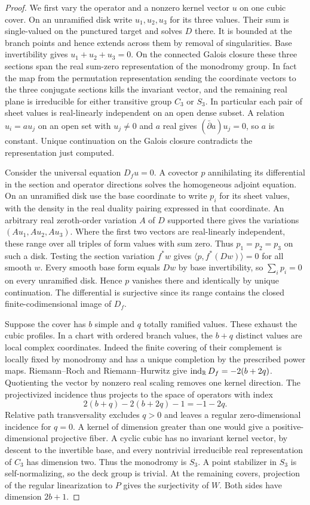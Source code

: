 \begin{proof}
We first vary the operator and a nonzero kernel vector $u$ on one
cubic cover. On an unramified disk write $u_1,u_2,u_3$ for its three
values. Their sum is single-valued on the punctured target and
solves $D$ there. It is bounded at the branch points and hence
extends across them by removal of singularities. Base invertibility
gives $u_1+u_2+u_3=0$. On the connected Galois closure these three
sections span the real sum-zero representation of the monodromy
group. In fact the map from the permutation representation sending
the coordinate vectors to the three conjugate sections kills the
invariant vector, and the remaining real plane is irreducible for
either transitive group $C_3$ or $S_3$. In particular each pair of
sheet values is real-linearly independent on an open dense subset.
A relation $u_i=a u_j$ on an open set with $u_j\ne0$ and $a$ real
gives $(\bar\partial a)u_j=0$, so $a$ is constant. Unique
continuation on the Galois closure contradicts the representation
just computed.

Consider the universal equation $D_fu=0$. A covector $p$ annihilating
its differential in the section and operator directions solves the
homogeneous adjoint equation. On an unramified disk use the base
coordinate to write $p_i$ for its sheet values, with the density
in the real duality pairing expressed in that coordinate.
An arbitrary real zeroth-order variation $A$ of $D$ supported there
gives the variations $(Au_1,Au_2,Au_3)$. Where the first two vectors
are real-linearly independent, these range over all triples of form
values with sum zero. Thus $p_1=p_2=p_3$ on such a disk. Testing the
section variation $f^*w$ gives $\langle p,f^*(Dw)\rangle=0$ for
all smooth $w$. Every smooth base form equals $Dw$ by base
invertibility, so $\sum_i p_i=0$ on every unramified disk. Hence
$p$ vanishes there and identically by unique continuation. The
differential is surjective since its range contains the closed
finite-codimensional image of $D_f$.

Suppose the cover has $b$ simple and $q$ totally ramified values.
These exhaust the cubic profiles. In a chart with ordered branch
values, the $b+q$ distinct values are local complex coordinates.
Indeed the finite covering of their complement is locally fixed by
monodromy and has a unique completion by the prescribed power maps.
Riemann--Roch and Riemann--Hurwitz give
$\operatorname{ind}_{\mathbb R}D_f=-2(b+2q)$. Quotienting the vector by
nonzero real scaling removes one kernel direction. The projectivized
incidence thus projects to the space of operators with index
\[
                    2(b+q)-2(b+2q)-1=-1-2q .
\]
Relative path transversality excludes $q>0$ and leaves a regular
zero-dimensional incidence for $q=0$. A kernel of dimension greater
than one would give a positive-dimensional projective fiber. A cyclic
cubic has no invariant kernel vector, by descent to the invertible
base, and every nontrivial irreducible real representation of $C_3$
has dimension two. Thus the monodromy is $S_3$. A point stabilizer
in $S_3$ is self-normalizing, so the deck group is trivial. At the
remaining covers, projection of the regular linearization to $P$ gives
the surjectivity of $W$. Both sides have dimension $2b+1$.


\end{proof}
